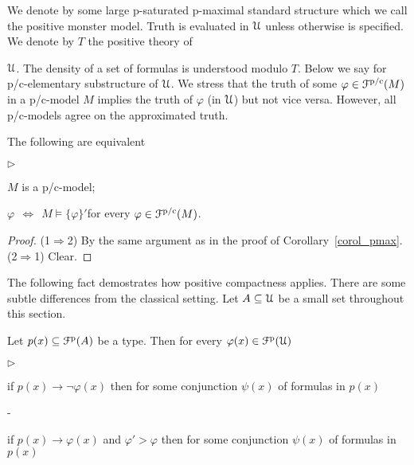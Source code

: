 \documentclass{amsproc}
\newcommand{\mylabel}[1]{{#1}\hfill}
\renewenvironment{itemize}
  {\begin{list}{$\triangleright$}{%
  \setlength{\parskip}{0mm}
  \setlength{\topsep}{.4\baselineskip}
  \setlength{\rightmargin}{0mm}
  \setlength{\listparindent}{0mm}
  \setlength{\itemindent}{0mm}
  \setlength{\labelwidth}{3ex}
  \setlength{\itemsep}{.2\baselineskip}
  \setlength{\parsep}{.2\baselineskip}
  \setlength{\partopsep}{0mm}
  \setlength{\labelsep}{1ex}
  \setlength{\leftmargin}{\labelwidth+\labelsep}
  \let\makelabel\mylabel}}{%
\end{list}}
\renewcommand*{\emph}[1]{%
   \smash{\tikz[baseline]\node[rectangle, fill=teal!25, rounded corners, inner xsep=0.5ex, inner ysep=0.2ex, anchor=base, minimum height = 2.7ex]{\strut #1};}}
\begin{document}
We denote by \emph{${\EuScript U}$\/} some large p-saturated p-maximal standard structure which we call the positive monster model.
Truth is evaluated in ${\EuScript U}$ unless otherwise is specified.
We denote by $T$ the positive theory of {${\EuScript U}$.
The density of a set of formulas is understood modulo $T$.
Below we say \emph{p/c-model\/} for p/c-elementary substructure of ${\EuScript U}$.
We stress that the truth of some $\varphi\in{\EuScript F}^{\rm p/c}(M)$ in a p/c-model $M$ implies the truth of $\varphi$ (in ${\EuScript U}$) but not vice versa.
However, all p/c-models agree on the approximated truth.

\begin{fact}
  The following are equivalent 
  \begin{itemize}
    \item[1.] $M$ is a p/c-model;
    \item[2.] $\varphi\ \ \Leftrightarrow\ \ M\models\big\{\varphi\big\}'$\quad for every $\varphi\in{\EuScript F}^{\rm p/c}(M)$.
  \end{itemize}
\end{fact}

\begin{proof}
  (1$\Rightarrow$2) By the same argument as in the proof of Corollary~\ref{corol_pmax}. (2$\Rightarrow$1) Clear.
\end{proof}

The following fact demostrates how positive compactness applies.
There are some subtle differences from the classical setting.
Let $A\subseteq{\EuScript U}$ be a small set throughout this section.

\begin{fact}\label{fact_compactness_imp}
  Let $p(x)\subseteq{\EuScript F}^{\rm p}(A)$ be a type.
  Then for every  $\varphi(x)\in{\EuScript F}^{\rm p}({\EuScript U})$
  \begin{itemize}
    \item[i.] if $p(x)\rightarrow\neg\varphi(x)$ then for some conjunction $\psi(x)$ of formulas in $p(x)$
    
    \noindent\kern-\leftmargin

    \item[ii.] if $p(x)\rightarrow\varphi(x)$ and $\varphi'>\varphi$ then for some conjunction $\psi(x)$ of formulas in $p(x)$
    

\end{itemize}
\end{fact}}
\end{document}
